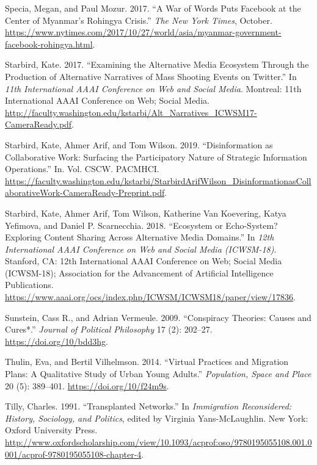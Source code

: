 \documentclass[
]{article}
\newlength{\cslhangindent}
\newenvironment{cslreferences}%
  {\setlength{\parindent}{0pt}%
  \everypar{\setlength{\hangindent}{\cslhangindent}}\ignorespaces}%
  {\par}
\begin{document}
\begin{cslreferences}
\leavevmode\hypertarget{ref-Specia2017War}{}%
Specia, Megan, and Paul Mozur. 2017. ``A War of Words Puts Facebook at
the Center of Myanmar's Rohingya Crisis.'' \emph{The New York Times},
October.
\url{https://www.nytimes.com/2017/10/27/world/asia/myanmar-government-facebook-rohingya.html}.

\leavevmode\hypertarget{ref-Starbird2017Examining}{}%
Starbird, Kate. 2017. ``Examining the Alternative Media Ecosystem
Through the Production of Alternative Narratives of Mass Shooting Events
on Twitter.'' In \emph{11th International AAAI Conference on Web and
Social Media}. Montreal: 11th International AAAI Conference on Web;
Social Media.
\url{http://faculty.washington.edu/kstarbi/Alt_Narratives_ICWSM17-CameraReady.pdf}.

\leavevmode\hypertarget{ref-KateStarbird2019Disinformation}{}%
Starbird, Kate, Ahmer Arif, and Tom Wilson. 2019. ``Disinformation as
Collaborative Work: Surfacing the Participatory Nature of Strategic
Information Operations.'' In. Vol. CSCW. PACMHCI.
\url{https://faculty.washington.edu/kstarbi/StarbirdArifWilson_DisinformationasCollaborativeWork-CameraReady-Preprint.pdf}.

\leavevmode\hypertarget{ref-Starbird2018Ecosystem}{}%
Starbird, Kate, Ahmer Arif, Tom Wilson, Katherine Van Koevering, Katya
Yefimova, and Daniel P. Scarnecchia. 2018. ``Ecosystem or Echo-System?
Exploring Content Sharing Across Alternative Media Domains.'' In
\emph{12th International AAAI Conference on Web and Social Media
(ICWSM-18)}. Stanford, CA: 12th International AAAI Conference on Web;
Social Media (ICWSM-18); Association for the Advancement of Artificial
Intelligence Publications.
\url{https://www.aaai.org/ocs/index.php/ICWSM/ICWSM18/paper/view/17836}.

\leavevmode\hypertarget{ref-Sunstein2009Conspiracy}{}%
Sunstein, Cass R., and Adrian Vermeule. 2009. ``Conspiracy Theories:
Causes and Cures*.'' \emph{Journal of Political Philosophy} 17 (2):
202--27. \url{https://doi.org/10/bdd3hg}.

\leavevmode\hypertarget{ref-Thulin2014Virtual}{}%
Thulin, Eva, and Bertil Vilhelmson. 2014. ``Virtual Practices and
Migration Plans: A Qualitative Study of Urban Young Adults.''
\emph{Population, Space and Place} 20 (5): 389--401.
\url{https://doi.org/10/f24m9s}.

\leavevmode\hypertarget{ref-Tilly1991Transplanted}{}%
Tilly, Charles. 1991. ``Transplanted Networks.'' In \emph{Immigration
Reconsidered: History, Sociology, and Politics}, edited by Virginia
Yans-McLaughlin. New York: Oxford University Press.
\url{http://www.oxfordscholarship.com/view/10.1093/acprof:oso/9780195055108.001.0001/acprof-9780195055108-chapter-4}.


\end{cslreferences}
\end{document}
